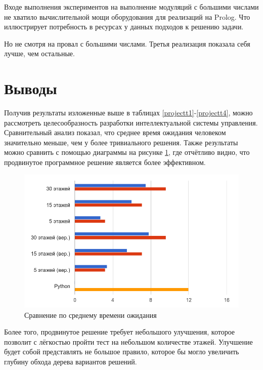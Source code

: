 		Входе выполнения экспериментов на выполнение модуляций с большими числами не хватило вычислительной мощи
		оборудования для реализаций на Prolog. Что иллюстрирует потребность в ресурсах у данных подходов
		к решению задачи.

		Но не смотря на провал с большими числами. Третья реализация показала себя лучше, чем остальные.








	\section{Выводы}

		Получив результаты изложенные выше в таблицах \ref{projectt1}-\ref{projectt4}, можно рассмотреть целесообразность
			разработки интеллектуальной системы управления. Сравнительный анализ показал, что среднее время ожидания
			человеком значительно меньше, чем у более тривиального решения. Также результаты можно сравнить с помощью
			диаграммы на рисунке \ref{pt1}, где отчётливо видно, что продвинутое программное решение является более эффективном.

		\begin{figure}[h]
			\centering
			\includegraphics[width=180mm]{src/pictures/projectp1.png}
			\caption{Сравнение по среднему времени ожидания}\label{pt1}
		\end{figure}

		Более того, продвинутое решение требует небольшого улучшения, которое позволит с лёгкостью пройти тест на
			небольшом количестве этажей. Улучшение будет собой представлять не большое правило, которое бы могло увеличить
			глубину обхода дерева вариантов решений.
			
